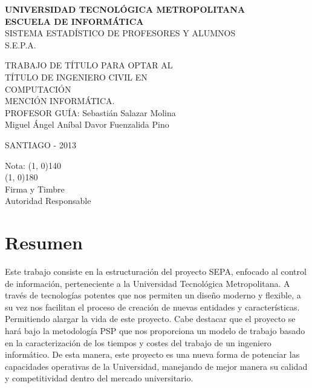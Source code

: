 \documentclass[a4paper,12pt,openany,oneside]{book}
\begin{document}
\thispagestyle{empty}
\begin{center}
\textbf{UNIVERSIDAD TECNOLÓGICA METROPOLITANA\\
ESCUELA DE INFORMÁTICA}\\
\vspace{3cm}
SISTEMA ESTADÍSTICO DE PROFESORES Y ALUMNOS\\S.E.P.A.
\end{center}
\begin{flushright}
TRABAJO DE TÍTULO PARA OPTAR AL\\
TÍTULO DE INGENIERO CIVIL EN\\
COMPUTACIÓN\\
MENCIÓN INFORMÁTICA.\\
\vspace{3cm}
PROFESOR GUÍA: Sebastián Salazar Molina\\
\vspace{1.5cm}
Miguel Ángel Aníbal Davor Fuenzalida Pino
\end{flushright}
\vspace{4cm}
\begin{center}
SANTIAGO - 2013
\end{center}
\newpage
\thispagestyle{empty}
\begin{flushright}
\vspace{20mm}
Nota: \line(1, 0){140} \\
\vspace{30 mm}
\line(1, 0){180}\\	
Firma y Timbre\\
Autoridad Responsable
\end{flushright}
\chapter*{Resumen}
\thispagestyle{empty}
Este trabajo consiste en la estructuración del proyecto SEPA, enfocado al control de información, perteneciente a la Universidad Tecnológica Metropolitana. A través de tecnologías potentes que nos permiten un diseño moderno y flexible, a su vez nos facilitan el proceso de creación de nuevas entidades y características. Permitiendo alargar la vida de este proyecto. Cabe destacar que el proyecto se hará bajo la metodología PSP que nos proporciona un modelo de trabajo basado en la caracterización de los tiempos y costes del trabajo de un ingeniero informático. De esta manera, este proyecto es una nueva forma de potenciar las capacidades operativas de la Universidad, manejando de mejor manera su calidad y competitividad dentro del mercado universitario.
\end{document}

